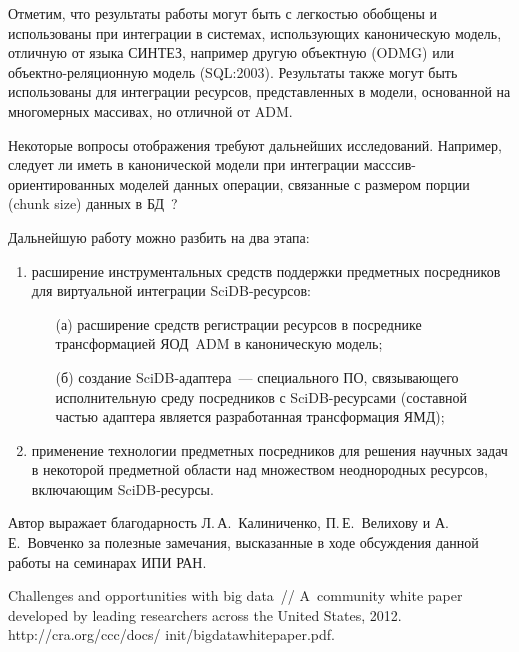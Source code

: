\begin{multicols}{2}
        Отметим, что результаты работы могут быть с легкостью обобщены и 
использованы при интеграции в системах, использующих каноническую 
модель, отличную от языка СИНТЕЗ, например другую объектную (ODMG) 
или объект\-но-ре\-ля\-ци\-он\-ную модель (SQL:2003). Результаты также могут 
быть использованы для интеграции ресурсов, представленных в модели, 
основанной на многомерных массивах, но отличной от ADM.
        
        Некоторые вопросы отображения требуют дальнейших исследований. 
Например, следует ли иметь в канонической модели при интеграции 
        масс\-сив-ори\-ен\-ти\-ро\-ван\-ных моделей данных операции, 
связанные с размером порции (chunk size) данных в БД~\cite{9-stu}?
        
        Дальнейшую работу можно разбить на два этапа:
        \begin{enumerate}[(1)]
\item расширение инструментальных средств поддержки предметных 
посредников для виртуальной интеграции SciDB-ресурсов: 
\begin{itemize}
\item[(а)] расширение средств регистрации ресурсов в посреднике~\cite{10-stu} 
трансформацией ЯОД\ ADM в каноническую модель; 
\item[(б)] создание 
SciDB-адап\-те\-ра~--- специального ПО, связывающего исполнительную 
среду посредников с SciDB-ресурсами (составной частью адаптера является 
разработанная трансформация ЯМД);
\end{itemize}
\item применение технологии предметных посредников для решения 
научных задач в некоторой предметной области над множеством\linebreak 
неоднородных ресурсов, включающим SciDB-ре\-сурсы.
\end{enumerate}

\bigskip
        Автор выражает благодарность Л.\,А.~Калиниченко, П.\,Е.~Велихову и 
А.\,Е.~Вовченко за полезные замечания, высказанные в ходе обсуждения 
данной работы на семинарах ИПИ РАН.

\vspace*{-6pt}

{\small\frenchspacing
{%
\begin{thebibliography}{99}

\vspace*{-2pt}

Challenges and opportunities with big data~// A~community white paper developed 
by leading researchers across the United States, 2012. {\sf http://cra.org/ccc/docs/ init/bigdatawhitepaper.pdf}. 


\end{thebibliography}}}
\end{multicols}
